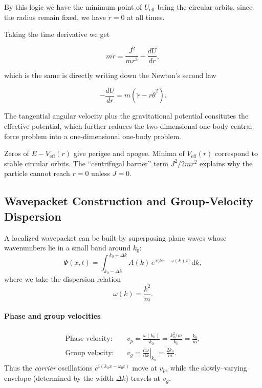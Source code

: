 \documentclass[a4paper,12pt]{report}
\begin{document}
By this logic we have the minimum point of \(U_{\text{eff} } \) being the circular orbits, since the radius remain fixed, we have \(\dot{r} = 0\) at all times. 


Taking the time derivative we get 

\begin{equation}
	m \ddot{r} = \frac{J^2}{mr^3 } - \frac{dU}{dr},
\end{equation}

which is the same is directly writing down the Newton's second law 

\begin{equation}
	-\frac{dU}{dr} = m(\ddot{r} - r \dot{\theta }^2  ).
\end{equation}

The tangential angular velocity plus the gravitational potential consitutes the effective potential, which further reduces the two-dimensional one-body central force problem into a one-dimensional one-body problem. 

Zeros of \(E-V_{\text{eff} }(r)  \) give perigee and apogee. Minima of \(V_{\text{eff} }(r) \) correspond to stable circular orbits. The ``centrifugal barrier'' term \(J^2/2mr^2\) explains why the particle cannot reach \(r=0\) unless \(J=0\).      

\subsection*{Wavepacket Construction and Group‐Velocity Dispersion}

A localized wavepacket can be built by superposing plane waves whose wavenumbers lie in a small band around \(k_0\):
\[
\Psi(x,t) 
= \int_{k_0 - \Delta k}^{\,k_0 + \Delta k} 
A(k)\,e^{\,i\bigl(kx - \omega(k)\,t\bigr)}\,\mathrm{d}k,
\]
where we take the dispersion relation
\[
\omega(k) = \frac{k^2}{m}.
\]

\medskip

\paragraph{Phase and group velocities}
\begin{align*}
\text{Phase velocity:}\quad &v_p = \frac{\omega(k_0)}{k_0}
= \frac{k_0^2/m}{k_0} = \frac{k_0}{m},\\
\text{Group velocity:}\quad &v_g = \left.\frac{\mathrm{d}\omega}{\mathrm{d}k}\right|_{k_0}
= \frac{2k_0}{m}.
\end{align*}
Thus the \emph{carrier} oscillations \(e^{i(k_0 x - \omega_0 t)}\) move at \(v_p\), while the slowly–varying envelope (determined by the width \(\Delta k\)) travels at \(v_g\).
\end{document}
